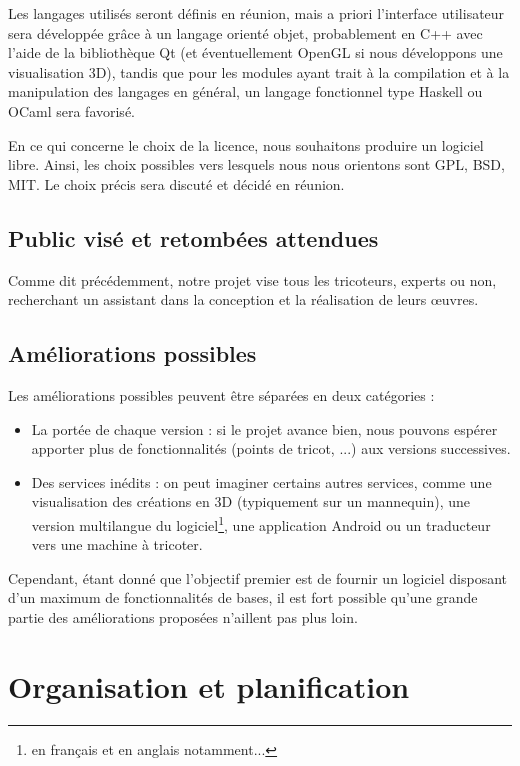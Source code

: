 \documentclass{article}
\begin{document}
Les langages utilisés seront définis en réunion, mais a priori l'interface utilisateur sera développée grâce à un langage orienté objet, 
probablement en C++ avec l'aide de la bibliothèque Qt (et éventuellement OpenGL si nous développons une visualisation 3D), tandis que pour 
les modules ayant trait à la compilation et à la manipulation des langages en général, un langage fonctionnel type Haskell ou OCaml sera 
favorisé.

En ce qui concerne le choix de la licence, nous souhaitons produire un logiciel libre. Ainsi, les choix possibles vers lesquels nous nous 
orientons sont GPL, BSD, MIT. Le choix précis sera discuté et décidé en réunion.

\subsection{Public visé et retombées attendues}

Comme dit précédemment, notre projet vise tous les tricoteurs, experts ou non, recherchant un assistant dans la conception et la
réalisation de leurs \oe{}uvres.

\subsection{Améliorations possibles}

Les améliorations possibles peuvent être séparées en deux catégories :
\begin{itemize}
   \item La portée de chaque version : si le projet avance bien, nous pouvons espérer apporter plus de fonctionnalités (points de 
tricot, ...) aux versions successives. 
   \item Des services inédits : on peut imaginer certains autres services, comme une visualisation des créations 
en 3D (typiquement sur un mannequin), une version multilangue du logiciel\footnote{en français et en anglais notamment...}, une 
application Android ou un traducteur vers une machine à tricoter.
\end{itemize}
Cependant, étant donné que l'objectif premier est de fournir un logiciel disposant d'un maximum de fonctionnalités de bases, il est fort 
possible qu'une grande partie des améliorations proposées n'aillent pas plus loin.


\section{Organisation et planification}
\end{document}
